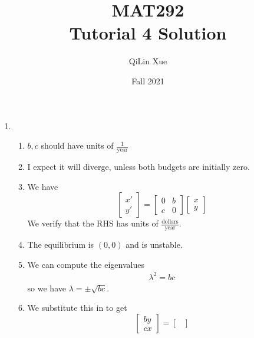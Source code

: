 \documentclass{article}
\title{MAT292 \\ Tutorial 4 Solution}
\author{QiLin Xue}
\date{Fall 2021}
\begin{document}
\newcommand{\tabitem}{~~\llap{\textbullet}~~}

\maketitle
\begin{enumerate}
    \item
          \begin{enumerate}
              \item
                    $b,c$ should have units of $\frac{1}{\text{year}}$
              \item I expect it will diverge, unless both budgets are initially zero.
              \item We have
                    \begin{equation}
                        \begin{bmatrix}
                            x' \\ y'
                        \end{bmatrix} = \begin{bmatrix}
                            0 & b \\
                            c & 0
                        \end{bmatrix}\begin{bmatrix}
                            x \\ y
                        \end{bmatrix}
                    \end{equation}
                    We verify that the RHS has units of $\frac{\text{dollars}}{\text{year}}$.
              \item The equilibrium is $(0,0)$ and is unstable.
              \item We can compute the eigenvalues
                    \begin{align}
                        \lambda^2 = bc
                    \end{align}
                    so we have $\lambda=\pm \sqrt{bc}$.
              \item We substitute this in to get
                    \begin{equation}
                        \begin{bmatrix}
                            by \\ cx
                        \end{bmatrix} = \begin{bmatrix}

\end{bmatrix}
\end{equation}
\end{enumerate}
\end{enumerate}
\end{document}
